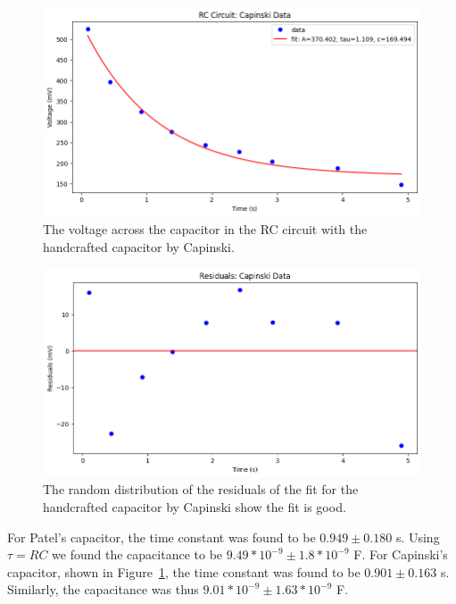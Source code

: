 \documentclass[11pt]{article}
\begin{document}
    \begin{figure}[H]
        \includegraphics[width=1.0\linewidth]{resources/images/rlc part 1b capinski graph}
        \caption{The voltage across the capacitor in the RC circuit with the handcrafted capacitor by Capinski.}
        \label{fig:part1b_graph_capinski}
    \end{figure}

    \begin{figure}[H]
        \includegraphics[width=1.0\linewidth]{resources/images/rlc part 1b graph capinski residuals}
        \caption{The random distribution of the residuals of the fit for the handcrafted capacitor by Capinski show the fit is good.}
        \label{fig:part1b_residuals_capinski}
    \end{figure}

    For Patel's capacitor, the time constant was found to be $0.949 \pm 0.180$ s.
    Using $\tau = RC$ we found the capacitance to be $9.49*10^{-9} \pm 1.8*10^{-9}$ F\@.
    For Capinski's capacitor, shown in Figure~\ref{fig:part1b_graph_capinski}, the time constant was found to be $0.901 \pm 0.163$ s.
    Similarly, the capacitance was thus $9.01*10^{-9} \pm 1.63*10^{-9}$ F\@.
\end{document}
